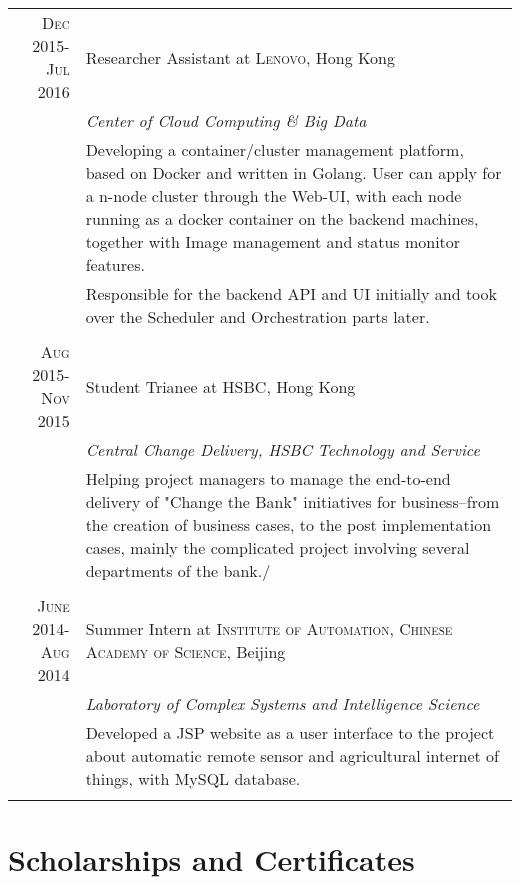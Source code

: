 \documentclass[a4paper,8pt]{article} %
\begin{document}
\begin{tabular}{r|p{11cm}}


\textsc{Dec 2015-Jul 2016} & Researcher Assistant at \textsc{Lenovo}, Hong Kong\\
& \emph{Center of Cloud Computing \& Big Data} \\
& \footnotesize{Developing a container/cluster management platform, based on Docker and written in Golang. User can apply for a n-node cluster through the Web-UI, with each node running as a docker container on the backend machines, together with Image management and status monitor features.} \\
& \footnotesize{Responsible for the backend API and UI initially and took over the Scheduler and Orchestration parts later.}\\
\multicolumn{2}{c}{} \\

\textsc{Aug 2015-Nov 2015}  & Student Trianee at \textsc{HSBC}, Hong Kong \\
& \emph{Central Change Delivery, HSBC Technology and Service}\\ 
& \footnotesize{Helping project managers to manage the end-to-end delivery of "Change the Bank" initiatives for business--from the creation of business cases, to the post implementation cases, mainly the complicated project involving several departments of the bank./}\\
\multicolumn{2}{c}{} \\


\textsc{June 2014-Aug 2014} & Summer Intern at \textsc{Institute of Automation, Chinese Academy of Science}, Beijing\\
& \emph{Laboratory of Complex Systems and Intelligence Science} \\
& \footnotesize{Developed a JSP website as a user interface to the project about automatic remote sensor and agricultural internet of things, with MySQL database.}\\
\multicolumn{2}{c}{} \\
\end{tabular}



\section{Scholarships and Certificates}
\end{document}

